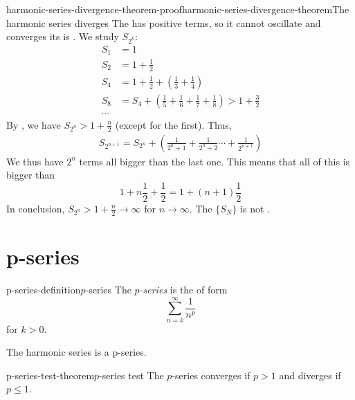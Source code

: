 \documentclass[preview]{standalone}
\begin{document}
\begin{snippetproof}{harmonic-series-divergence-theorem-proof}{harmonic-series-divergence-theorem}{The harmonic series diverges}
    The \series has positive terms, so it cannot oscillate and converges \ifandonlyif its \partialsum \sequence
    is . We study \(S_{2^k}\):
    \begin{align*}
        S_1 &= 1 \\
        S_2 &= 1 + \frac{1}{2} \\
        S_4 &= 1 + \frac{1}{2} + \left(\frac{1}{3} + \frac{1}{4}\right) \\
        S_8 &= S_4 + \left(\frac{1}{5} + \frac{1}{6} + \frac{1}{7} + \frac{1}{8}\right) > 1 + \frac{3}{2} \\
        \cdots
    \end{align*}
    By \principleofinduction[induction], we have \(S_{2^n} > 1 + \frac{n}{2}\) (except for the first).
    Thus, \begin{align*}
        S_{2^{n+1}} = S_{2^n} + \left(\frac{1}{2^n + 1} + \frac{1}{2^n + 2} \cdots + \frac{1}{2^{n+1}}\right)
    \end{align*}
    We thus have \(2^n\) terms all bigger than the last one.
    This means that all of this is bigger than
    \[
        1 + n\frac{1}{2} + \frac{1}{2} = 1 + (n+1)\frac{1}{2}
    \]
    In conclusion, \(S_{2^n} > 1 + \frac{n}{2} \to \infty\) for \(n\to \infty\).
    The \sequence \(\{S_N\}\) is not .
\end{snippetproof}

\section{p-series}

\begin{snippetdefinition}{p-series-definition}{\(p\)-series}
    The \emph{\(p\)-series} is the \series of form
    \[\sum_{n=k}^\infty \frac{1}{n^p}\]
    for \(k > 0\).
\end{snippetdefinition}

\begin{plainhtml}
    The harmonic series is a p-series.
\end{plainhtml}

\begin{snippettheorem}{p-series-test-theorem}{\(p\)-series test}
    The \(p\)-series converges if \(p > 1\) and diverges if \(p \leq 1\).
\end{snippettheorem}
\end{document}

